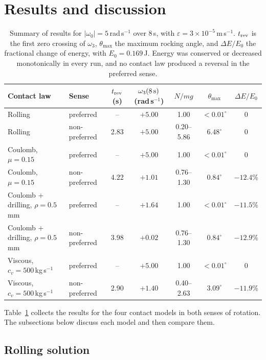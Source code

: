 \documentclass[aps,pre,twocolumn,superscriptaddress,amsmath,amssymb,floatfix,nofootinbib]{revtex4-2}
\begin{document}
\section{Results and discussion}\label{sec:results}

\begin{table}[t]
\caption{Summary of results for $|\omega_0|=5$\,rad\,s$^{-1}$ over $8$\,s, with
$\varepsilon=3\times10^{-5}$\,m\,s$^{-1}$. $t_{\rm rev}$ is the first zero crossing of
$\omega_3$, $\theta_{\max}$ the maximum rocking angle, and $\Delta E/E_0$ the fractional
change of energy, with $E_0=0.169$\,J. Energy was conserved or decreased monotonically in
every run, and no contact law produced a reversal in the preferred sense.}
\label{tab:results}
\begin{ruledtabular}
\begin{tabular}{llccccc}
Contact law & Sense & $t_{\rm rev}$ (s) & $\omega_3(8\,{\rm s})$ (rad\,s$^{-1}$) &
$N/mg$ & $\theta_{\max}$ & $\Delta E/E_0$ \\
\hline
Rolling & preferred & -- & $+5.00$ & 1.00 & $<0.01^\circ$ & $0$ \\
Rolling & non-preferred & 2.83 & $+5.00$ & 0.20--5.86 & $6.48^\circ$ & $0$ \\
Coulomb, $\mu=0.15$ & preferred & -- & $+5.00$ & 1.00 & $<0.01^\circ$ & $0$ \\
Coulomb, $\mu=0.15$ & non-preferred & 4.22 & $+1.01$ & 0.76--1.30 & $0.84^\circ$ & $-12.4\%$ \\
Coulomb + drilling, $\rho=0.5$\,mm & preferred & -- & $+1.64$ & 1.00 & $<0.01^\circ$ & $-11.5\%$ \\
Coulomb + drilling, $\rho=0.5$\,mm & non-preferred & 3.98 & $+0.02$ & 0.76--1.30 & $0.84^\circ$ & $-12.9\%$ \\
Viscous, $c_v=500$\,kg\,s$^{-1}$ & preferred & -- & $+5.00$ & 1.00 & $<0.01^\circ$ & $0$ \\
Viscous, $c_v=500$\,kg\,s$^{-1}$ & non-preferred & 2.90 & $+1.40$ & 0.40--2.63 & $3.09^\circ$ & $-11.9\%$ \\
\end{tabular}
\end{ruledtabular}
\end{table}

Table~\ref{tab:results} collects the results for the four contact models in both senses
of rotation. The subsections below discuss each model and then compare them.

\subsection{Rolling solution}
\end{document}
